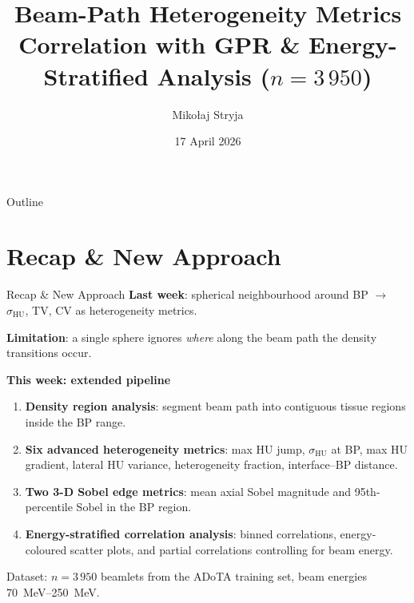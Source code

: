 \documentclass[aspectratio=169, 10pt]{beamer}
\title[ADoTA Heterogeneity Analysis]{Beam-Path Heterogeneity Metrics\\[4pt]
{\small Correlation with GPR \& Energy-Stratified Analysis ($n = 3\,950$)}}
\author[M.~Stryja]{Mikołaj Stryja}
\institute{Department of Radiation Science \& Technology}
\date{17 April 2026}
\begin{document}
\begin{frame}[plain]
  \titlepage
\end{frame}

\begin{frame}{Outline}
  \tableofcontents
\end{frame}

\section{Recap \& New Approach}

\begin{frame}{Recap \& New Approach}
  \textbf{Last week}: spherical neighbourhood around BP $\rightarrow$
  $\sigma_{\text{HU}}$, TV, CV as heterogeneity metrics.

  \vspace{6pt}
  \textbf{Limitation}: a single sphere ignores \emph{where} along the beam
  path the density transitions occur.

  \vspace{6pt}
  \textbf{This week: extended pipeline}
  \begin{enumerate}
    \item \textbf{Density region analysis}: segment beam path into contiguous
          tissue regions inside the BP range.
    \item \textbf{Six advanced heterogeneity metrics}: max HU jump,
          $\sigma_{\text{HU}}$ at BP, max HU gradient, lateral HU variance,
          heterogeneity fraction, interface--BP distance.
    \item \textbf{Two 3-D Sobel edge metrics}: mean axial Sobel magnitude
          and 95th-percentile Sobel in the BP region.
    \item \textbf{Energy-stratified correlation analysis}: binned
          correlations, energy-coloured scatter plots, and partial
          correlations controlling for beam energy.
  \end{enumerate}

  \vspace{4pt}
  {\small Dataset: $n = 3\,950$ beamlets from the ADoTA training set,
  beam energies \SIrange{70}{250}{MeV}.}
\end{frame}

\end{document}
